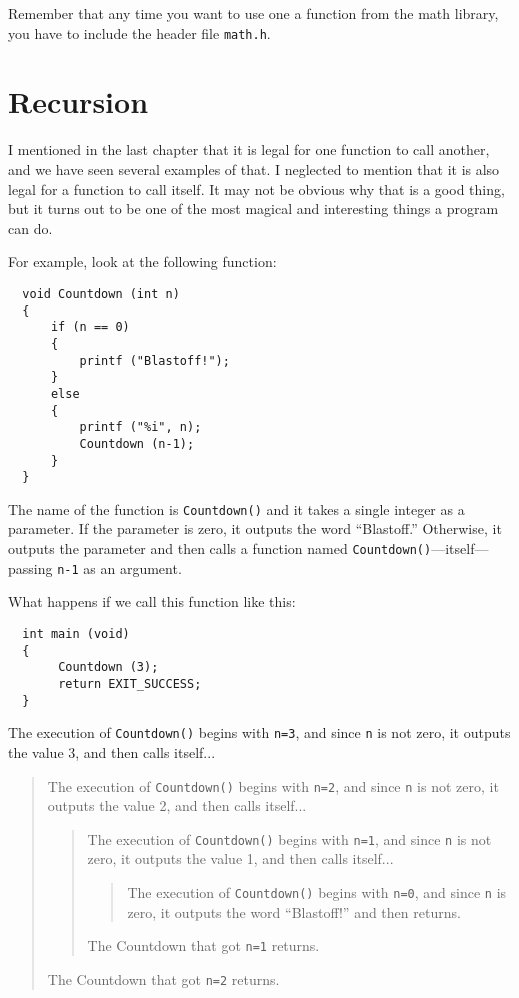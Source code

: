 Remember that any time you want to use one a function from the math
library, you have to include the header file {\tt math.h}.

\section{Recursion}
\label{recursion}

I mentioned in the last chapter that it is legal for one function to
call another, and we have seen several examples of that.  I neglected
to mention that it is also legal for a function to call itself.  It
may not be obvious why that is a good thing, but it turns out to be
one of the most magical and interesting things a program can do.

For example, look at the following function:

\begin{verbatim}
  void Countdown (int n) 
  {
      if (n == 0) 
      {
          printf ("Blastoff!");
      }
      else
      {
          printf ("%i", n);
          Countdown (n-1);
      }
  }
\end{verbatim}
%
The name of the function is {\tt Countdown()} and it takes a single
integer as a parameter.  If the parameter is zero, it outputs
the word ``Blastoff.''  Otherwise, it outputs the parameter and
then calls a function named {\tt Countdown()}---itself---passing
{\tt n-1} as an argument.

What happens if we call this function like this:

\begin{verbatim}
  int main (void)
  {
       Countdown (3);
       return EXIT_SUCCESS;
  }
\end{verbatim}
%
The execution of {\tt Countdown()} begins with {\tt n=3}, and
since {\tt n} is not zero, it outputs the value 3, and then
calls itself...

\begin{quote}
The execution of {\tt Countdown()} begins with {\tt n=2}, and
since {\tt n} is not zero, it outputs the value 2, and then
calls itself...

\begin{quote}
The execution of {\tt Countdown()} begins with {\tt n=1}, and
since {\tt n} is not zero, it outputs the value 1, and then
calls itself...

\begin{quote}
The execution of {\tt Countdown()} begins with {\tt n=0}, and
since {\tt n} is zero, it outputs the word ``Blastoff!''
and then returns.
\end{quote}

The Countdown that got {\tt n=1} returns.

\end{quote}

The Countdown that got {\tt n=2} returns.

\end{quote}

